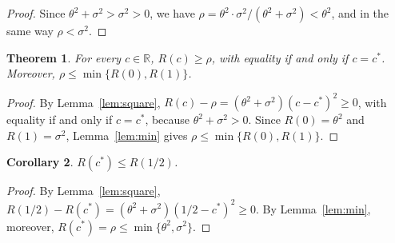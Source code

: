 \documentclass[11pt]{article}
\newtheorem{theorem}{Theorem}[section]
\newtheorem{corollary}[theorem]{Corollary}
\theoremstyle{definition}
\begin{document}
\begin{proof}
Since $\theta^2 + \sigma^2 > \sigma^2 > 0$, we have
$\rho = \theta^2 \cdot \sigma^2 / (\theta^2 + \sigma^2) < \theta^2$, and in the same way $\rho < \sigma^2$.
\end{proof}

\begin{theorem}\label{thm:oracle}
For every $c \in \mathbb{R}$, $R(c) \ge \rho$, with equality if and only if $c = c^\ast$. Moreover,
$\rho \le \min\{R(0), R(1)\}$.
\end{theorem}

\begin{proof}
By Lemma~\ref{lem:square}, $R(c) - \rho = (\theta^2 + \sigma^2)(c - c^\ast)^2 \ge 0$, with equality if and only if
$c = c^\ast$, because $\theta^2 + \sigma^2 > 0$. Since $R(0) = \theta^2$ and $R(1) = \sigma^2$,
Lemma~\ref{lem:min} gives $\rho \le \min\{R(0), R(1)\}$.
\end{proof}

\begin{corollary}\label{cor:half}
$R(c^\ast) \le R(1/2)$.
\end{corollary}

\begin{proof}
By Lemma~\ref{lem:square}, $R(1/2) - R(c^\ast) = (\theta^2 + \sigma^2)(1/2 - c^\ast)^2 \ge 0$. By
Lemma~\ref{lem:min}, moreover, $R(c^\ast) = \rho \le \min\{\theta^2, \sigma^2\}$.
\end{proof}
\end{document}
